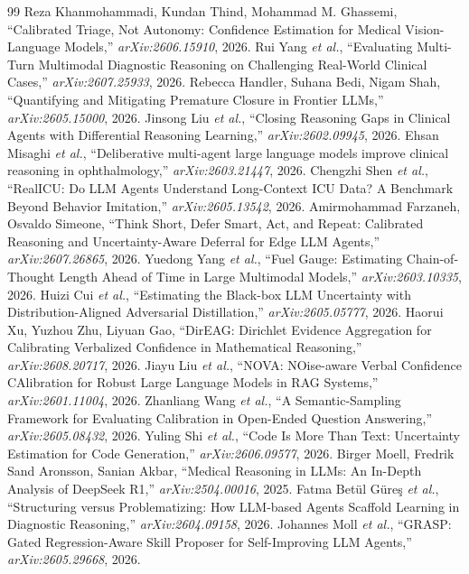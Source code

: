 \documentclass[journal,twoside]{IEEEtran}
\begin{document}
\begin{thebibliography}{99}
 Reza Khanmohammadi, Kundan Thind, Mohammad M. Ghassemi, ``Calibrated Triage, Not Autonomy: Confidence Estimation for Medical Vision-Language Models,'' \emph{arXiv:2606.15910}, 2026.
 Rui Yang \emph{et al.}, ``Evaluating Multi-Turn Multimodal Diagnostic Reasoning on Challenging Real-World Clinical Cases,'' \emph{arXiv:2607.25933}, 2026.
 Rebecca Handler, Suhana Bedi, Nigam Shah, ``Quantifying and Mitigating Premature Closure in Frontier LLMs,'' \emph{arXiv:2605.15000}, 2026.
 Jinsong Liu \emph{et al.}, ``Closing Reasoning Gaps in Clinical Agents with Differential Reasoning Learning,'' \emph{arXiv:2602.09945}, 2026.
 Ehsan Misaghi \emph{et al.}, ``Deliberative multi-agent large language models improve clinical reasoning in ophthalmology,'' \emph{arXiv:2603.21447}, 2026.
 Chengzhi Shen \emph{et al.}, ``RealICU: Do LLM Agents Understand Long-Context ICU Data? A Benchmark Beyond Behavior Imitation,'' \emph{arXiv:2605.13542}, 2026.
 Amirmohammad Farzaneh, Osvaldo Simeone, ``Think Short, Defer Smart, Act, and Repeat: Calibrated Reasoning and Uncertainty-Aware Deferral for Edge LLM Agents,'' \emph{arXiv:2607.26865}, 2026.
 Yuedong Yang \emph{et al.}, ``Fuel Gauge: Estimating Chain-of-Thought Length Ahead of Time in Large Multimodal Models,'' \emph{arXiv:2603.10335}, 2026.
 Huizi Cui \emph{et al.}, ``Estimating the Black-box LLM Uncertainty with Distribution-Aligned Adversarial Distillation,'' \emph{arXiv:2605.05777}, 2026.
 Haorui Xu, Yuzhou Zhu, Liyuan Gao, ``DirEAG: Dirichlet Evidence Aggregation for Calibrating Verbalized Confidence in Mathematical Reasoning,'' \emph{arXiv:2608.20717}, 2026.
 Jiayu Liu \emph{et al.}, ``NOVA: NOise-aware Verbal Confidence CAlibration for Robust Large Language Models in RAG Systems,'' \emph{arXiv:2601.11004}, 2026.
 Zhanliang Wang \emph{et al.}, ``A Semantic-Sampling Framework for Evaluating Calibration in Open-Ended Question Answering,'' \emph{arXiv:2605.08432}, 2026.
 Yuling Shi \emph{et al.}, ``Code Is More Than Text: Uncertainty Estimation for Code Generation,'' \emph{arXiv:2606.09577}, 2026.
 Birger Moell, Fredrik Sand Aronsson, Sanian Akbar, ``Medical Reasoning in LLMs: An In-Depth Analysis of DeepSeek R1,'' \emph{arXiv:2504.00016}, 2025.
 Fatma Betül Güreş \emph{et al.}, ``Structuring versus Problematizing: How LLM-based Agents Scaffold Learning in Diagnostic Reasoning,'' \emph{arXiv:2604.09158}, 2026.
 Johannes Moll \emph{et al.}, ``GRASP: Gated Regression-Aware Skill Proposer for Self-Improving LLM Agents,'' \emph{arXiv:2605.29668}, 2026.
\end{thebibliography}
\end{document}
